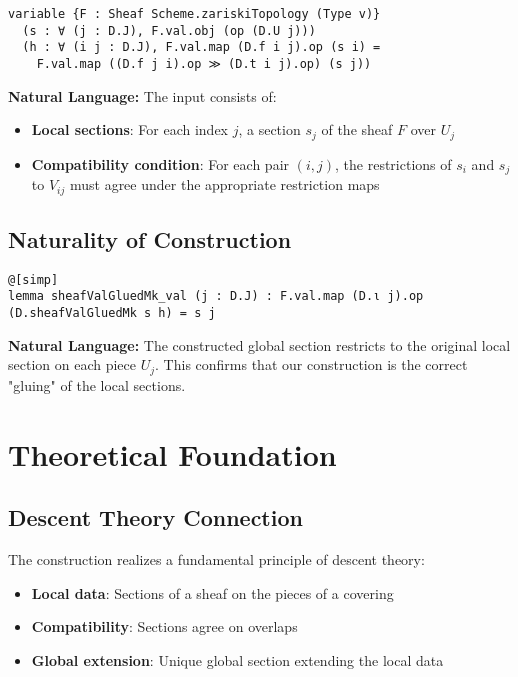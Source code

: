 \documentclass{article}
\theoremstyle{definition}
\begin{document}
\begin{lstlisting}
variable {F : Sheaf Scheme.zariskiTopology (Type v)}
  (s : ∀ (j : D.J), F.val.obj (op (D.U j)))
  (h : ∀ (i j : D.J), F.val.map (D.f i j).op (s i) =
    F.val.map ((D.f j i).op ≫ (D.t i j).op) (s j))
\end{lstlisting}

\textbf{Natural Language:} The input consists of:
\begin{itemize}
\item \textbf{Local sections}: For each index $j$, a section $s_j$ of the sheaf $F$ over $U_j$
\item \textbf{Compatibility condition}: For each pair $(i,j)$, the restrictions of $s_i$ and $s_j$ to $V_{ij}$ must agree under the appropriate restriction maps
\end{itemize}

\subsection{Naturality of Construction}

\begin{lstlisting}
@[simp]
lemma sheafValGluedMk_val (j : D.J) : F.val.map (D.ι j).op (D.sheafValGluedMk s h) = s j
\end{lstlisting}

\textbf{Natural Language:} The constructed global section restricts to the original local section on each piece $U_j$. This confirms that our construction is the correct "gluing" of the local sections.

\section{Theoretical Foundation}

\subsection{Descent Theory Connection}

The construction realizes a fundamental principle of descent theory:
\begin{itemize}
\item \textbf{Local data}: Sections of a sheaf on the pieces of a covering
\item \textbf{Compatibility}: Sections agree on overlaps  
\item \textbf{Global extension}: Unique global section extending the local data
\end{itemize}
\end{document}
